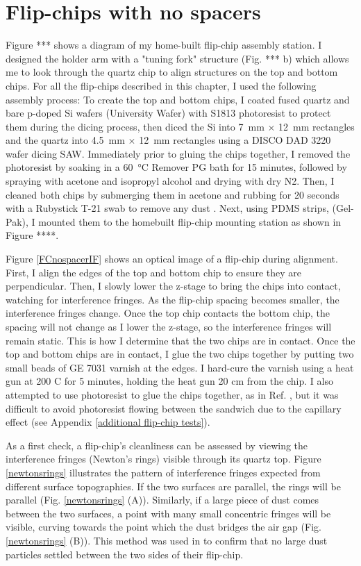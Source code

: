 \documentclass[double,12pt,1in]{beavtex}
\begin{document}
\section{Flip-chips with no spacers} \label{FCfab}
Figure *** shows a diagram of my home-built flip-chip assembly station. I designed the holder arm with a "tuning fork" structure (Fig. *** b) which allows me to look through the quartz chip to align structures on the top and bottom chips. For all the flip-chips described in this chapter, I used the following assembly process: To create the top and bottom chips, I coated fused quartz and bare p-doped Si wafers (University Wafer) with S1813 photoresist to protect them during the dicing process, then diced the Si into \SI{7}{\milli\meter} $\times$ \SI{12}{\milli\meter} rectangles and the quartz into \SI{4.5}{\milli\meter} $\times$ \SI{12}{\milli\meter} rectangles using a DISCO DAD 3220 wafer dicing SAW. Immediately prior to gluing the chips together, I removed the photoresist by soaking in a \SI{60}{\celsius} Remover PG bath for 15 minutes, followed by spraying with acetone and isopropyl alcohol and drying with dry N2. Then, I cleaned both chips by submerging them in acetone and rubbing for 20 seconds with a Rubystick T-21 swab to remove any dust \cite{lane_integrating_nodate}. Next, using PDMS strips, (Gel-Pak), I mounted them to the homebuilt flip-chip mounting station as shown in Figure ****. 

Figure \ref{FCnospacerIF} shows an optical image of a flip-chip during alignment. First, I align the edges of the top and bottom chip to ensure they are perpendicular. Then, I slowly lower the z-stage to bring the chips into contact, watching for interference fringes. As the flip-chip spacing becomes smaller, the interference fringes change. Once the top chip contacts the bottom chip, the spacing will not change as I lower the z-stage, so the interference fringes will remain static. This is how I determine that the two chips are in contact. Once the top and bottom chips are in contact, I glue the two chips together by putting two small beads of GE 7031 varnish at the edges. I hard-cure the varnish using a heat gun at 200 C for 5 minutes, holding the heat gun 20 cm from the chip. I also attempted to use photoresist to glue the chips together, as in Ref. \cite{beukman_noninvasive_2015}, but it was difficult to avoid photoresist flowing between the sandwich due to the capillary effect (see Appendix \ref{additional flip-chip tests}).

As a first check, a flip-chip's cleanliness can be assessed by viewing the interference fringes (Newton's rings) visible through its quartz top. Figure \ref{newtonsrings} illustrates the pattern of interference fringes expected from different surface topographies. If the two surfaces are parallel, the rings will be parallel (Fig. \ref{newtonsrings} (A)). Similarly, if a large piece of dust comes between the two surfaces, a point with many small concentric fringes will be visible, curving towards the point which the dust bridges the air gap (Fig. \ref{newtonsrings} (B)). This method was used in \cite{bennaceur_mechanical_2015} to confirm that no large dust particles settled between the two sides of their flip-chip.
\end{document}
